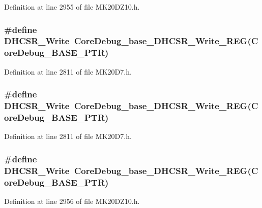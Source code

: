 Definition at line 2955 of file M\+K20\+D\+Z10.\+h.

\subsubsection[{\texorpdfstring{D\+H\+C\+S\+R\+\_\+\+Write}{DHCSR_Write}}]{\setlength{\rightskip}{0pt plus 5cm}\#define D\+H\+C\+S\+R\+\_\+\+Write~{\bf Core\+Debug\+\_\+base\+\_\+\+D\+H\+C\+S\+R\+\_\+\+Write\+\_\+\+R\+EG}({\bf Core\+Debug\+\_\+\+B\+A\+S\+E\+\_\+\+P\+TR})}\hypertarget{group___core_debug___register___accessor___macros_ga3c374ff0f88587d03fd707ebc0a06169}{}\label{group___core_debug___register___accessor___macros_ga3c374ff0f88587d03fd707ebc0a06169}


Definition at line 2811 of file M\+K20\+D7.\+h.

\subsubsection[{\texorpdfstring{D\+H\+C\+S\+R\+\_\+\+Write}{DHCSR_Write}}]{\setlength{\rightskip}{0pt plus 5cm}\#define D\+H\+C\+S\+R\+\_\+\+Write~{\bf Core\+Debug\+\_\+base\+\_\+\+D\+H\+C\+S\+R\+\_\+\+Write\+\_\+\+R\+EG}({\bf Core\+Debug\+\_\+\+B\+A\+S\+E\+\_\+\+P\+TR})}\hypertarget{group___core_debug___register___accessor___macros_ga3c374ff0f88587d03fd707ebc0a06169}{}\label{group___core_debug___register___accessor___macros_ga3c374ff0f88587d03fd707ebc0a06169}


Definition at line 2811 of file M\+K20\+D7.\+h.

\subsubsection[{\texorpdfstring{D\+H\+C\+S\+R\+\_\+\+Write}{DHCSR_Write}}]{\setlength{\rightskip}{0pt plus 5cm}\#define D\+H\+C\+S\+R\+\_\+\+Write~{\bf Core\+Debug\+\_\+base\+\_\+\+D\+H\+C\+S\+R\+\_\+\+Write\+\_\+\+R\+EG}({\bf Core\+Debug\+\_\+\+B\+A\+S\+E\+\_\+\+P\+TR})}\hypertarget{group___core_debug___register___accessor___macros_ga3c374ff0f88587d03fd707ebc0a06169}{}\label{group___core_debug___register___accessor___macros_ga3c374ff0f88587d03fd707ebc0a06169}


Definition at line 2956 of file M\+K20\+D\+Z10.\+h.


